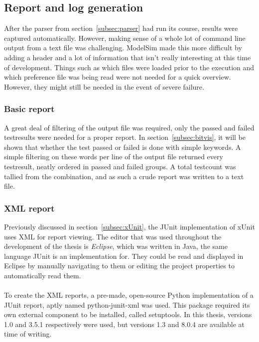 \documentclass[11pt,british]{article}
\begin{document}
\subsection{Report and log generation}
\label{subsec:reports}
After the parser from section~\ref{subsec:parser} had run its course, results were captured automatically. However, making sense of a whole lot of command line output from a text file was challenging. ModelSim made this more difficult by adding a header and a lot of information that isn't really interesting at this time of development. Things such as which files were loaded prior to the execution and which preference file was being read were not needed for a quick overview. However, they might still be needed in the event of severe failure.

\subsubsection{Basic report}
A great deal of filtering of the output file was required, only the passed and failed testresults were needed for a proper report. In section~\ref{subsec:bitvis}, it will be shown that whether the test passed or failed is done with simple keywords. A simple filtering on these words per line of the output file returned every testresult, neatly ordered in passed and failed groups. A total testcount was tallied from the combination, and as such a crude report was written to a text file.

\subsubsection{XML report}
Previously discussed in section~\ref{subsec:xUnit}, the JUnit implementation of xUnit uses \gls{XML} for report viewing. The editor that was used throughout the development of the thesis is \emph{Eclipse}, which was written in Java, the same language JUnit is an implementation for. They could be read and displayed in Eclipse by manually navigating to them or editing the project properties to automatically read them.
\\
\\
To create the XML reports, a pre-made, open-source Python implementation of a JUnit report, aptly named python-junit-xml was used. This package required its own external component to be installed, called setuptools.\cite{junitxml, setuptools} In this thesis, versions 1.0 and 3.5.1 respectively were used, but versions 1.3 and 8.0.4 are available at time of writing. 
\end{document}
